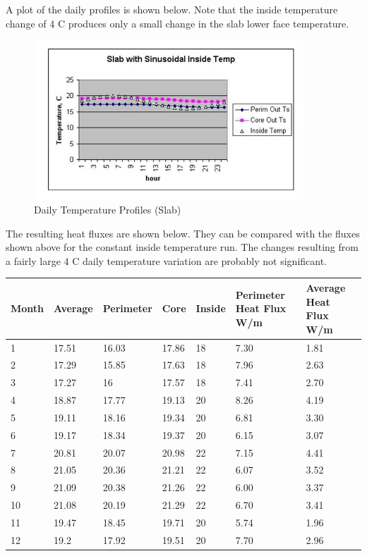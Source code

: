 A plot of the daily profiles is shown below. Note that the inside temperature change of 4 C produces only a small change in the slab lower face temperature.

\begin{figure}[hbtp] %
\centering
\includegraphics[width=0.9\textwidth, height=0.9\textheight, keepaspectratio=true]{media/image017.jpg}
\caption{Daily Temperature Profiles (Slab) \protect \label{fig:daily-temperature-profiles-slab}}
\end{figure}

The resulting heat fluxes are shown below. They can be compared with the fluxes shown above for the constant inside temperature run. The changes resulting from a fairly large 4 C daily temperature variation are probably not significant.

\begin{longtable}[c]{p{0.85in}p{0.85in}p{0.85in}p{0.85in}p{0.85in}p{0.85in}p{0.85in}}
\toprule 
Month & Average & Perimeter & Core & Inside & Perimeter Heat Flux W/m & Average Heat Flux W/m \tabularnewline \midrule
\endhead
1 & 17.51 & 16.03 & 17.86 & 18 & 7.30 & 1.81 \tabularnewline
2 & 17.29 & 15.85 & 17.63 & 18 & 7.96 & 2.63 \tabularnewline
3 & 17.27 & 16 & 17.57 & 18 & 7.41 & 2.70 \tabularnewline
4 & 18.87 & 17.77 & 19.13 & 20 & 8.26 & 4.19 \tabularnewline
5 & 19.11 & 18.16 & 19.34 & 20 & 6.81 & 3.30 \tabularnewline
6 & 19.17 & 18.34 & 19.37 & 20 & 6.15 & 3.07 \tabularnewline
7 & 20.81 & 20.07 & 20.98 & 22 & 7.15 & 4.41 \tabularnewline
8 & 21.05 & 20.36 & 21.21 & 22 & 6.07 & 3.52 \tabularnewline
9 & 21.09 & 20.38 & 21.26 & 22 & 6.00 & 3.37 \tabularnewline
10 & 21.08 & 20.19 & 21.29 & 22 & 6.70 & 3.41 \tabularnewline
11 & 19.47 & 18.45 & 19.71 & 20 & 5.74 & 1.96 \tabularnewline
12 & 19.2 & 17.92 & 19.51 & 20 & 7.70 & 2.96 \tabularnewline
\bottomrule
\end{longtable}
